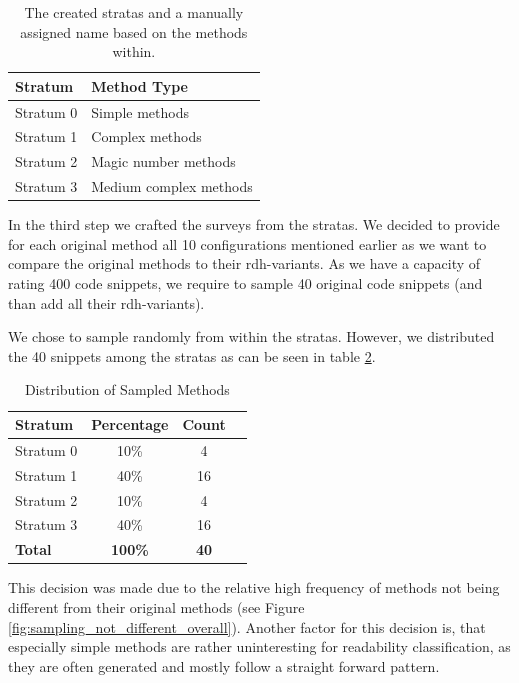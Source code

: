 \documentclass[%
class=scrreprt,
chapterprefix=false,%
open=right,%
twoside=false,%
paper=a4,%
logofile={Logo\_zentral\_farbig\_EN.png},%
thesistype=master,%
UKenglish,%
]{se2thesis}
\begin{document}
	\begin{table}[htbp]
		\centering
		\begin{tabular}{ll}
			\toprule
			\textbf{Stratum} & \textbf{Method Type} \\
			\midrule
			Stratum 0 & Simple methods \\
			Stratum 1 & Complex methods \\
			Stratum 2 & Magic number methods \\
			Stratum 3 & Medium complex methods \\
			\bottomrule
		\end{tabular}
		\caption{The created stratas and a manually assigned name based on the methods within.}
		\label{tab:survey_strata_labeles}
	\end{table}
	
	In the third step we crafted the surveys from the stratas. We decided to provide for each original method all 10 configurations mentioned earlier as we want to compare the original methods to their rdh-variants. As we have a capacity of rating 400 code snippets, we require to sample 40 original code snippets (and than add all their rdh-variants).	
	
	We chose to sample randomly from within the stratas. However, we distributed the 40 snippets among the stratas as can be seen in table \ref{tab:sampled_methods}.
	
	\begin{table}[htbp]
		\centering
		\begin{tabular}{lccc}
			\toprule
			\textbf{Stratum} & \textbf{Percentage} & \textbf{Count} \\
			\midrule
			Stratum 0 & 10\% & 4 \\
			Stratum 1 & 40\% & 16 \\
			Stratum 2 & 10\% & 4 \\
			Stratum 3 & 40\% & 16 \\
			\midrule
			\textbf{Total} & \textbf{100\%} & \textbf{40} \\
			\bottomrule
		\end{tabular}
		\caption{Distribution of Sampled Methods}
		\label{tab:sampled_methods}
	\end{table}
	
	This decision was made due to the relative high frequency of methods not being different from their original methods (see Figure \ref{fig:sampling_not_different_overall}). Another factor for this decision is, that especially simple methods are rather uninteresting for readability classification, as they are often generated and mostly follow a straight forward pattern.
	
\end{document}

